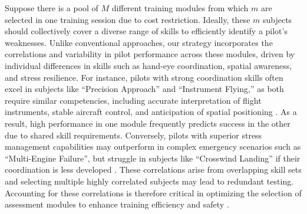 \documentclass[opre,sglanonrev]{informs4}
\begin{document}
Suppose there is a pool of $M$ different training modules from which $m$ are selected in one training session due to cost restriction. Ideally, these $m$ subjects should collectively cover a diverse range of skills to efficiently identify a pilot’s weaknesses. Unlike conventional approaches, our strategy incorporates the correlations and variability in pilot performance across these modules, driven by individual differences in skills such as hand-eye coordination, spatial awareness, and stress resilience. For instance, pilots with strong coordination skills often excel in subjects like ``Precision Approach'' and ``Instrument Flying,'' as both require similar competencies, including accurate interpretation of flight instruments, stable aircraft control, and anticipation of spatial positioning \citep{Damos2003}. As a result, high performance in one module frequently predicts success in the other due to shared skill requirements. Conversely, pilots with superior stress management capabilities may outperform in complex emergency scenarios such as ``Multi-Engine Failure'', but struggle in subjects like ``Crosswind Landing'' if their coordination is less developed \citep{Szczepanska2025}. These correlations arise from overlapping skill sets and selecting multiple highly correlated subjects may lead to redundant testing.%
 Accounting for these correlations is therefore critical in optimizing the selection of assessment modules to enhance training efficiency and safety \citep{Duruaku2024}. 
\end{document}
